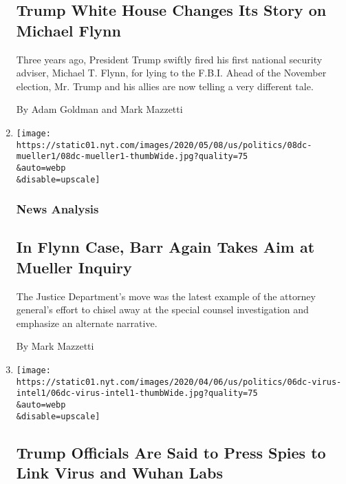 \begin{enumerate}
  \hypertarget{trump-white-house-changes-its-story-on-michael-flynn}{%
  \subsection{Trump White House Changes Its Story on Michael
  Flynn}\label{trump-white-house-changes-its-story-on-michael-flynn}}

  Three years ago, President Trump swiftly fired his first national
  security adviser, Michael T. Flynn, for lying to the F.B.I. Ahead of
  the November election, Mr. Trump and his allies are now telling a very
  different tale.

  By Adam Goldman and Mark Mazzetti
\item
  \href{/2020/05/08/us/politics/barr-mueller-investigation-flynn.html}{}

  \texttt{[image: https://static01.nyt.com/images/2020/05/08/us/politics/08dc-mueller1/08dc-mueller1-thumbWide.jpg?quality=75\\\&auto=webp\\\&disable=upscale]}

  \hypertarget{news-analysis-2}{%
  \subsubsection{News Analysis}\label{news-analysis-2}}

  \hypertarget{in-flynn-case-barr-again-takes-aim-at-mueller-inquiry}{%
  \subsection{In Flynn Case, Barr Again Takes Aim at Mueller
  Inquiry}\label{in-flynn-case-barr-again-takes-aim-at-mueller-inquiry}}

  The Justice Department's move was the latest example of the attorney
  general's effort to chisel away at the special counsel investigation
  and emphasize an alternate narrative.

  By Mark Mazzetti
\item
  \href{/2020/04/30/us/politics/trump-administration-intelligence-coronavirus-china.html}{}

  \texttt{[image: https://static01.nyt.com/images/2020/04/06/us/politics/06dc-virus-intel1/06dc-virus-intel1-thumbWide.jpg?quality=75\\\&auto=webp\\\&disable=upscale]}

  \hypertarget{trump-officials-are-said-to-press-spies-to-link-virus-and-wuhan-labs}{%
  \subsection{Trump Officials Are Said to Press Spies to Link Virus and
  Wuhan
  Labs}\label{trump-officials-are-said-to-press-spies-to-link-virus-and-wuhan-labs}}


\end{enumerate}
